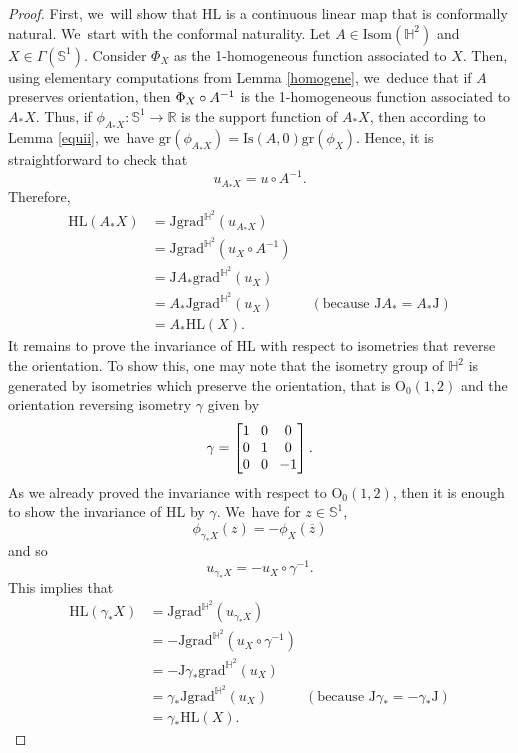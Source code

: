 \documentclass[10pt]{amsart}
\theoremstyle{plain}
\theoremstyle{definition}
\newcommand{\grad}{\mathrm{grad}^{\mathbb{H}^2}}
\newcommand{\J}{\mathrm{J}}
\begin{document}
\begin{proof}
First, we~will show that $\mathrm{HL}$ is a continuous linear map that is conformally natural. We~start with the conformal naturality. Let $A \in \mathrm{Isom}(\mathbb{H}^2)$ and $X \in \Gamma(\mathbb{S}^1)$. Consider $\Phi_X$ as the 1-homogeneous function associated to $X$. Then, using elementary computations from Lemma \ref{homogene}, we~deduce that if $A$ preserves orientation, then $\Phi_X \circ\nobreak A^{-1}$ is the 1-homogeneous function associated to $A_* X$. Thus, if $\phi_{A_* X}:\mathbb{S}^1 \to \mathbb{R}$ is the support function of $A_* X$, then according to Lemma \ref{equii}, we~have $\mathrm{gr}(\phi_{A_* X}) = \mathrm{Is}(A, 0) \mathrm{gr}(\phi_X)$. Hence, it is straightforward to check that
\[
u_{A_*X}=u\circ A^{-1}.
\]
Therefore,
\begin{align*}
\mathrm{HL}(A_*X)&=\J\grad(u_{A_*X})\\
&=\J\grad(u_X\circ A^{-1})\\
&=\J A_* \grad(u_X)\\
&=A_*\J\grad(u_X) \ \ \ \ \ \ \ \ \ \ \ \ (\text{because $\J A_*=A_*\J$})\\
&=A_*\mathrm{HL}(X).
\end{align*}
It remains to prove the invariance of $\mathrm{HL}$ with respect to isometries that reverse the orientation. To show this, one may note that the isometry group of $\mathbb{H}^2$ is generated by isometries which preserve the orientation, that is $\mathrm{O}_0(1,2)$ and the orientation reversing isometry $\gamma$ given by
\[\arraycolsep4pt
\gamma=\begin{bmatrix}
1 & 0 & 0 \\
0 & 1 & 0 \\
0 & 0 & -1
\end{bmatrix}.
\]
As we already proved the invariance with respect to $\mathrm{O}_0(1,2)$, then it is enough to show the invariance of $\mathrm{HL}$ by $\gamma$. We~have for $z \in \mathbb{S}^1$,
\[
\phi_{\gamma_*X}(z)=-\phi_X(\overline{z})
\]
and so
\[
u_{\gamma_*X}=-u_X\circ\gamma^{-1}.
\]
This implies that \begin{align*}
\mathrm{HL}(\gamma_*X)&=\J\grad(u_{\gamma_*X})\\
&=-\J\grad(u_X\circ \gamma^{-1})\\
&=-\J \gamma_* \grad(u_X)\\
&=\gamma_*\J\grad(u_X) \ \ \ \ \ \ \ \ \ \ \ \ (\text{because $\J \gamma_*=-\gamma_*\J$})\\
&=\gamma_*\mathrm{HL}(X).
\end{align*}

\end{proof}
\end{document}
